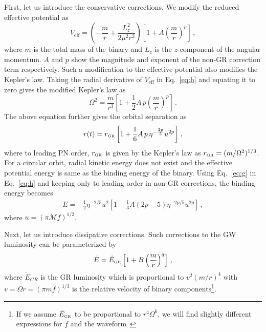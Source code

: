 \documentclass[prd,twocolumn,nofootinbib]{revtex4-1}
\newcommand{\GR}{{\mbox{\tiny GR}}}
\begin{document}
First, let us introduce the conservative corrections. We modify the reduced effective potential as
 \begin{equation}\label{eq:h}
 V_{\text{eff}}=\left(-\frac{m}{r}+\frac{{L}^2_{z}}{2\mu^2r^2}\right)\left[1+A \left(\frac{m}{r}\right)^p\right]\,,
 \end{equation}
where $m$ is the total mass of the binary and $L_{z}$ is the $z$-component of the angular momentum. $A$ and $p$ show the magnitude and exponent of the non-GR correction term respectively. Such a modification to the effective potential also modifies the Kepler's law. Taking the radial derivative of $V_{\text{eff}}$ in Eq.~\eqref{eq:h} and equating it to zero gives the modified Kepler's law as
 \begin{equation}
 \Omega^2=\frac{m}{r^3} \left[1+\frac{1}{2} A \, p\left(\frac{m}{r}\right)^p\right]\,.
 \end{equation}
 The above equation further gives the orbital separation as
 \begin{equation}\label{eq:g}
 r(t)=r_{\GR}\left[1+\frac{1}{6}A\, p\, \eta^{-\frac{2p}{5}}u^{2p}\right]\,,
 \end{equation}
where to leading PN order, $r_{\GR}$ is given by the Kepler's law as $r_{\GR}=(m/\Omega^2)^{1/3}$. For a circular orbit, radial kinetic energy does not exist and the effective potential energy is same as the binding energy of the binary. Using Eq.~\eqref{eq:g} in Eq.~\eqref{eq:h} and keeping only to leading order in non-GR corrections, the binding energy becomes
\begin{align}\label{eq:j}
E=-\frac{1}{2}\eta^{-2/5}u^2\left[1-\frac{1}{3}A(2p-5)\eta^{-2p/5}u^{2p}\right]\,,
\end{align}
where $u=(\pi \mathcal{M} f)^{1/3}$.

Next, let us introduce dissipative corrections. Such corrections to the GW luminosity can be parameterized by
 \begin{equation}\label{eq:a}
 \dot{E}=\dot{E}_{\GR}\left[1+B\left(\frac{m}{r}\right)^q\right]\,,
 \end{equation}
 where $\dot{E}_{GR}$ is the GR luminosity which is proportional to $v^2(m/r)^4$ with $v=\Omega r = (\pi m f)^{1/3}$ is the relative velocity of binary components\footnote{If we assume $\dot{E}_{\GR}$ to be proportional to $r^4\Omega^6$, we will find slightly different expressions for $\dot{f}$ and the waveform~\cite{Chatziioannou:2012rf}}. 
 
\end{document}
